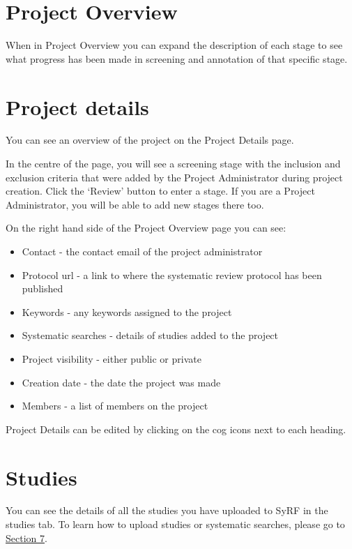 \documentclass[
]{book}
\providecommand{\tightlist}{%
  \setlength{\itemsep}{0pt}\setlength{\parskip}{0pt}}
\begin{document}
\hypertarget{project-overview}{%
\section{Project Overview}\label{project-overview}}

When in Project Overview you can expand the description of each stage to see what progress has been made in screening and annotation of that specific stage.

\hypertarget{project-details}{%
\section{Project details}\label{project-details}}

You can see an overview of the project on the Project Details page.

In the centre of the page, you will see a screening stage with the inclusion and exclusion criteria that were added by the Project Administrator during project creation. Click the `Review' button to enter a stage. If you are a Project Administrator, you will be able to add new stages there too.

On the right hand side of the Project Overview page you can see:

\begin{itemize}
\tightlist
\item
  Contact - the contact email of the project administrator
\item
  Protocol url - a link to where the systematic review protocol has been published
\item
  Keywords - any keywords assigned to the project
\item
  Systematic searches - details of studies added to the project
\item
  Project visibility - either public or private
\item
  Creation date - the date the project was made
\item
  Members - a list of members on the project
\end{itemize}

Project Details can be edited by clicking on the cog icons next to each heading.

\hypertarget{studies}{%
\section{Studies}\label{studies}}

You can see the details of all the studies you have uploaded to SyRF in the studies tab. To learn how to upload studies or systematic searches, please go to \href{https://camaradesuk.github.io/syrf_userguide/systematicSearch.html}{Section 7}.
\end{document}
